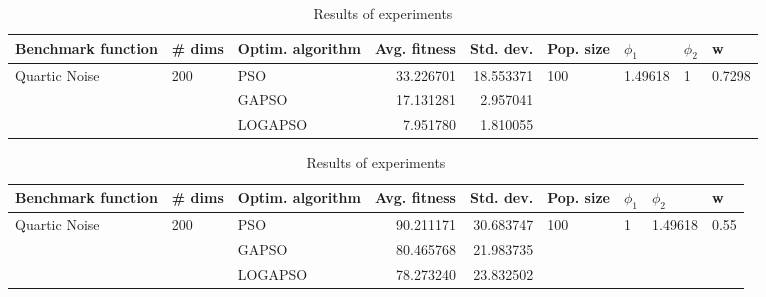 \documentclass{article}
\begin{document}
\begin{table}
\centering
\caption{Results of experiments}
\begin{tabular}{lllrrllll}
\toprule
            Benchmark function &              \# dims & Optim. algorithm &  Avg. fitness &  Std. dev. &            Pop. size &               $\phi_{1}$ &         $\phi_{2}$ &                       w \\
\midrule
\multirow{3}{*}{Quartic Noise} & \multirow{3}{*}{200} &              PSO &     33.226701 &  18.553371 & \multirow{3}{*}{100} & \multirow{3}{*}{1.49618} & \multirow{3}{*}{1} & \multirow{3}{*}{0.7298} \\
                               &                      &            GAPSO &     17.131281 &   2.957041 &                      &                          &                    &                         \\
                               &                      &          LOGAPSO &      7.951780 &   1.810055 &                      &                          &                    &                         \\
\bottomrule
\end{tabular}
\end{table}
\begin{table}
\centering
\caption{Results of experiments}
\begin{tabular}{lllrrllll}
\toprule
            Benchmark function &              \# dims & Optim. algorithm &  Avg. fitness &  Std. dev. &            Pop. size &         $\phi_{1}$ &               $\phi_{2}$ &                     w \\
\midrule
\multirow{3}{*}{Quartic Noise} & \multirow{3}{*}{200} &              PSO &     90.211171 &  30.683747 & \multirow{3}{*}{100} & \multirow{3}{*}{1} & \multirow{3}{*}{1.49618} & \multirow{3}{*}{0.55} \\
                               &                      &            GAPSO &     80.465768 &  21.983735 &                      &                    &                          &                       \\
                               &                      &          LOGAPSO &     78.273240 &  23.832502 &                      &                    &                          &                       \\
\bottomrule
\end{tabular}
\end{table}
\end{document}
